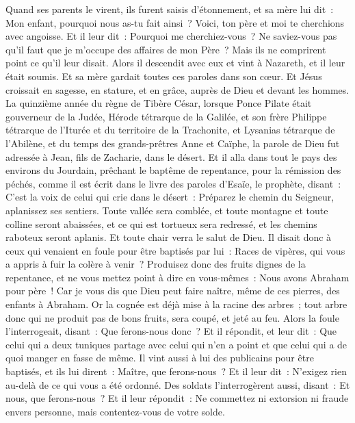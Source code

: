 \begin{multicols}{2}
Quand ses parents le virent, ils furent saisis d'étonnement, et sa mère lui dit~: Mon enfant, pourquoi nous as-tu fait ainsi~? Voici, ton père et moi te cherchions avec angoisse.
Et il leur dit~: Pourquoi me cherchiez-vous~? Ne saviez-vous pas qu'il faut que je m'occupe des affaires de mon Père~?
Mais ils ne comprirent point ce qu'il leur disait.
Alors il descendit avec eux et vint à Nazareth, et il leur était soumis. Et sa mère gardait toutes ces paroles dans son cœur.
Et Jésus croissait en sagesse, en stature, et en grâce, auprès de Dieu et devant les hommes.
\VerseOne{}La quinzième année du règne de Tibère César, lorsque Ponce Pilate était gouverneur de la Judée, Hérode tétrarque de la Galilée, et son frère Philippe tétrarque de l'Iturée et du territoire de la Trachonite, et Lysanias tétrarque de l'Abilène,
et du temps des grands-prêtres Anne et Caïphe, la parole de Dieu fut adressée à Jean, fils de Zacharie, dans le désert.
Et il alla dans tout le pays des environs du Jourdain, prêchant le baptême de repentance, pour la rémission des péchés,
comme il est écrit dans le livre des paroles d'Esaïe, le prophète, disant~: C'est la voix de celui qui crie dans le désert~: Préparez le chemin du Seigneur, aplanissez ses sentiers.
Toute vallée sera comblée, et toute montagne et toute colline seront abaissées, et ce qui est tortueux sera redressé, et les chemins raboteux seront aplanis.
Et toute chair verra le salut de Dieu.
Il disait donc à ceux qui venaient en foule pour être baptisés par lui~: Races de vipères, qui vous a appris à fuir la colère à venir~?
Produisez donc des fruits dignes de la repentance, et ne vous mettez point à dire en vous-mêmes~: Nous avons Abraham pour père~! Car je vous dis que Dieu peut faire naître, même de ces pierres, des enfants à Abraham.
Or la cognée est déjà mise à la racine des arbres~; tout arbre donc qui ne produit pas de bons fruits, sera coupé, et jeté au feu.
Alors la foule l'interrogeait, disant~: Que ferons-nous donc~?
Et il répondit, et leur dit~: Que celui qui a deux tuniques partage avec celui qui n'en a point et que celui qui a de quoi manger en fasse de même.
Il vint aussi à lui des publicains pour être baptisés, et ils lui dirent~: Maître, que ferons-nous~?
Et il leur dit~: N'exigez rien au-delà de ce qui vous a été ordonné.
Des soldats l'interrogèrent aussi, disant~: Et nous, que ferons-nous~? Et il leur répondit~: Ne commettez ni extorsion ni fraude envers personne, mais contentez-vous de votre solde.

\end{multicols}
